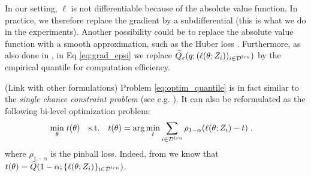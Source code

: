 \begin{remark}
	In our setting, $\ell$ is not differentiable because of the absolute value function. In practice, we therefore replace the gradient by a subdifferential (this is what we do in the experiments). Another possibility could be to replace the absolute value function with a smooth approximation, such as the Huber loss \citep{huber1964}. Furthermore, as also done in \citet{luo2022empirical}, in Eq \eqref{eq:grad_epsi} we replace $\widetilde{Q}_{\varepsilon}(q; (\ell(\theta;Z_i))_{i\in{\cal D}^{lrn}})$ by the empirical quantile for computation efficiency.
\end{remark}

\begin{remark}(Link with other formulations)
	Problem \eqref{eq:optim_quantile} is in fact similar to the \textit{single chance constraint problem} (see e.g. \citep{curtis2018sequential}). It can also be reformulated as the following  bi-level optimization problem: 
	\begin{align*}
		\min_{\theta} &\; t(\theta)
		\quad \text{s.t.} \quad t(\theta) = \arg\min_{t} \sum_{i\in{\cal D}^{lrn}} \rho_{1-\alpha}(\ell(\theta;Z_i) - t) \; .
	\end{align*}
	where $\rho_{1-\alpha}$ is the pinball loss. Indeed, from \cite{koenker1978regression, biau2011sequential} we know that $t(\theta) = \widehat{Q}(1-\alpha;\{\ell(\theta;Z_i)\}_{i\in{\cal D}^{lrn}})$.
\end{remark}

